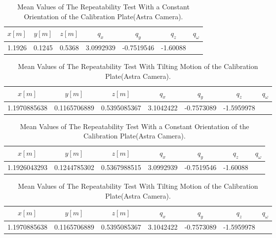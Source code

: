
\begin{table}[b]
\renewcommand{\arraystretch}{1.3}
\caption{Mean Values of The Repeatability Test With a Constant Orientation of the Calibration Plate(Astra Camera).}
\label{real1}
\centering
\begin{tabular}{|c||c||c||c||c||c||c|}
\hline
$x[m]$ & $y[m]$ & $z[m]$ & $q_{x}$ & $q_{y}$ & $q_{z}$ &$q_{\omega}$ \\
\hline
1.1926 & 0.1245 & 0.5368 & 3.0992939&-0.7519546&-1.60088 & \\
\hline
\hline
\end{tabular}
\end{table}


\begin{table}[b]
\renewcommand{\arraystretch}{1.3}
\caption{Mean Values of The Repeatability Test With Tilting Motion of the Calibration Plate(Astra Camera).}
\label{real1}
\centering
\begin{tabular}{|c||c||c||c||c||c||c|}
\hline
$x[m]$ & $y[m]$ & $z[m]$ & $q_{x}$ & $q_{y}$ & $q_{z}$ &$q_{\omega}$ \\
\hline
1.1970885638 & 0.1165706889 & 0.5395085367 & 3.1042422&-0.7573089&-1.5959978 & \\
\hline
\hline
\end{tabular}
\end{table}


		
		
\begin{table}[b]
\renewcommand{\arraystretch}{1.3}
\caption{Mean Values of The Repeatability Test With a Constant Orientation of the Calibration Plate(Astra Camera).}
\label{real1}
\centering
\begin{tabular}{|c||c||c||c||c||c||c|}
\hline
$x[m]$ & $y[m]$ & $z[m]$ & $q_{x}$ & $q_{y}$ & $q_{z}$ &$q_{\omega}$ \\
\hline
1.1926043293 & 0.1244785302 & 0.5367988515 & 3.0992939&-0.7519546&-1.60088 & \\
\hline
\hline
\end{tabular}
\end{table}


\begin{table}[b]
\renewcommand{\arraystretch}{1.3}
\caption{Mean Values of The Repeatability Test With Tilting Motion of the Calibration Plate(Astra Camera).}
\label{real1}
\centering
\begin{tabular}{|c||c||c||c||c||c||c|}
\hline
$x[m]$ & $y[m]$ & $z[m]$ & $q_{x}$ & $q_{y}$ & $q_{z}$ &$q_{\omega}$ \\
\hline
1.1970885638 & 0.1165706889 & 0.5395085367 & 3.1042422&-0.7573089&-1.5959978  \\
\hline
\hline
\end{tabular}
\end{table}


